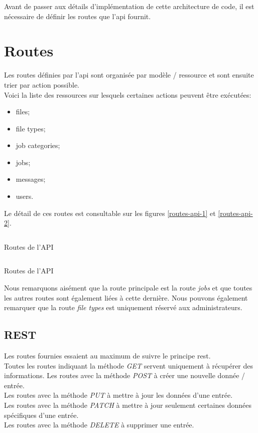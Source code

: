 \documentclass[
    iai, %
    il, %
]{heig-tb}
\begin{document}
Avant de passer aux détails d'implémentation de cette architecture de code, il est nécessaire de définir les routes que l'\Gls{api} fournit.

\section{Routes}
Les routes définies par l'\Gls{api} sont organisée par modèle / ressource et sont ensuite trier par action possible. \\
Voici la liste des ressources sur lesquels certaines actions peuvent être exécutées:
\begin{itemize}
    \item files;
    \item file types;
    \item job categories;
    \item jobs;
    \item messages;
    \item users.
\end{itemize}

Le détail de ces routes est consultable sur les figures \ref{routes-api-1} et \ref{routes-api-2}.
\begin{listing}[h]
    \inputminted{php}{assets/code/api-1.php}
    \caption{Routes de l'API \label{routes-api-2}}
\end{listing}

\begin{listing}[h]
    \inputminted{php}{assets/code/api-2.php}
    \caption{Routes de l'API \label{routes-api-1}}
\end{listing}

Nous remarquons aisément que la route principale est la route \emph{jobs} et que toutes les autres routes sont également liées à cette dernière. Nous pouvons également remarquer que la route \emph{file types} est uniquement réservé aux administrateurs.

\subsection{REST}
Les routes fournies essaient au maximum de suivre le principe \Gls{rest}. \\
Toutes les routes indiquant la méthode \emph{GET} servent uniquement à récupérer des informations.
Les routes avec la méthode \emph{POST} à créer une nouvelle donnée / entrée. \\
Les routes avec la méthode \emph{PUT} à mettre à jour les données d'une entrée. \\
Les routes avec la méthode \emph{PATCH} à mettre à jour seulement certaines données spécifiques d'une entrée. \\
Les routes avec la méthode \emph{DELETE} à supprimer une entrée.
\end{document}
